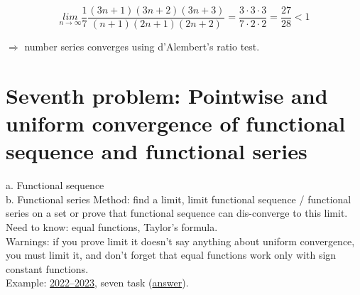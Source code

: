 \documentclass{article}
\begin{document}
\begin{equation*}
    \underset{n \rightarrow \infty}{lim} \frac{1}{7} \frac{(3n+1)(3n+2)(3n+3)}{(n+1)(2n+1)(2n+2)} = \frac{3 \cdot 3 \cdot 3}{7 \cdot 2 \cdot 2} = \frac{27}{28} < 1
\end{equation*}

     $\Rightarrow$ number series converges using d'Alembert's ratio test.


\newpage
\section{Seventh problem: Pointwise and uniform convergence of functional sequence and functional series}
a. Functional sequence \\
b. Functional series
Method: find a limit, limit functional sequence / functional series on a set or prove that functional sequence can dis-converge to this limit.\\
Need to know: equal functions, Taylor's formula. \\
Warnings: if you prove limit it doesn't say anything about uniform convergence, you must limit it, and don't forget that equal functions work only with sign constant functions. \\
Example: \href{https://old.mipt.ru/education/chair/mathematics/exams/exams/2022-23/%D0%9C%D0%90%D0%98%D0%B8%D0%A0_%D0%92_23.pdf}{2022–2023}, seven task (\href{https://old.mipt.ru/education/chair/mathematics/exams/exams/2022-23/%D0%9C%D0%90%D0%98%D0%B8%D0%A0_%D0%92_23%D0%BE%D1%82%D0%B2%D0%B5%D1%82%D1%8B.pdf}{answer}).
\end{document}
